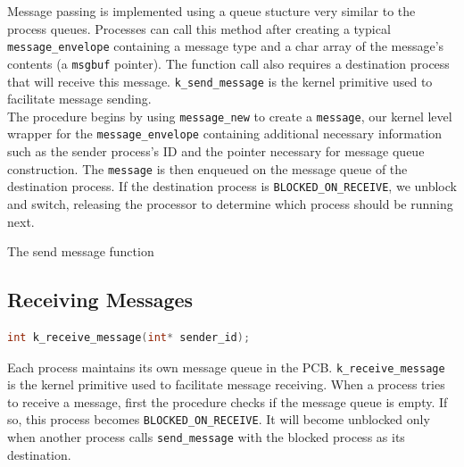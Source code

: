 \documentclass[12pt]{report}
\begin{document}
Message passing is implemented using a queue stucture very similar to the process queues. Processes can call this method after creating a typical {\tt message\_envelope} containing a message type and a char array of the message's contents (a {\tt msgbuf} pointer). The function call also requires a destination process that will receive this message. {\tt k\_send\_message} is the kernel primitive used to facilitate message sending.\\

The procedure begins by using {\tt message\_new} to create a {\tt message}, our kernel level wrapper for the {\tt message_envelope} containing additional necessary information such as the sender process's ID and the pointer necessary for message queue construction. The {\tt message} is then enqueued on the message queue of the destination process. If the destination process is {\tt BLOCKED\_ON\_RECEIVE}, we unblock and switch, releasing the processor to determine which process should be running next. \\

\begin{algorithm}
  \caption{The send message function}
  \begin{algorithmic}[1]
      
		\EndIf
    \EndProcedure
  \end{algorithmic}
\end{algorithm}

\subsection{Receiving Messages}

\begin{minipage}{\textwidth}
\begin{lstlisting}[language=C, frame=single]
int k_receive_message(int* sender_id);
\end{lstlisting}
\end{minipage}

Each process maintains its own message queue in the PCB. {\tt k\_receive\_message} is the kernel primitive used to facilitate message receiving. When a process tries to receive a message, first the procedure checks if the message queue is empty. If so, this process becomes {\tt BLOCKED\_ON\_RECEIVE}. It will become unblocked only when another process calls {\tt send\_message} with the blocked process as its destination. \\
\end{document}
